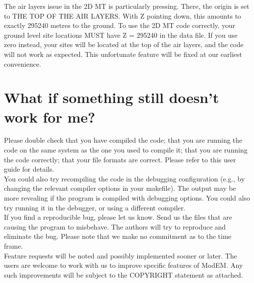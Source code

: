 \documentclass[12pt]{article}
\begin{document}
The air layers issue in the 2D MT is particularly pressing. There, the origin is set to THE TOP OF THE AIR LAYERS. With Z pointing down, this amounts to exactly 295240 metres to the ground. To use the 2D MT code correctly, your ground level site locations MUST have Z = 295240 in the data file. If you use zero instead, your sites will be located at the top of the air layers, and the code will not work as expected. This unfortunate feature will be fixed at our earliest convenience.


\section{What if something still doesn't work for me?}

Please double check that you have compiled the code; that you are running the code on the same system as the one you used to compile it; that you are running the code correctly; that your file formats are correct. Please refer to this user guide for details.\\

You could also try recompiling the code in the debugging configuration (e.g., by changing the relevant compiler options in your makefile). The output may be more revealing if the program is compiled with debugging options. You could also try running it in the debugger, or using a different compiler.\\

If you find a reproducible bug, please let us know. Send us the files that are causing the program to misbehave. The authors will try to reproduce and eliminate the bug. Please note that we make no commitment as to the time frame.\\

Feature requests will be noted and possibly implemented sooner or later.
The users are welcome to work with us to improve specific features of ModEM.
Any such improvements will be subject to the COPYRIGHT statement as attached. 
\end{document}
